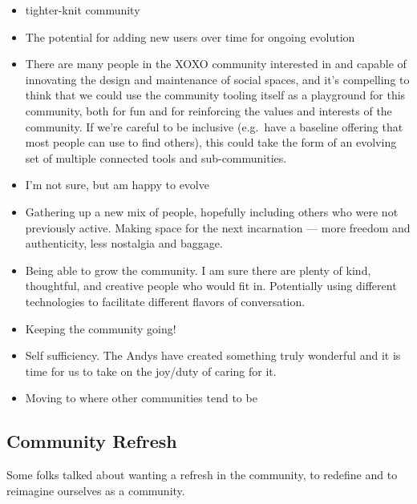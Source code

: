 \documentclass[
]{book}
\providecommand{\tightlist}{%
  \setlength{\itemsep}{0pt}\setlength{\parskip}{0pt}}
\begin{document}
\begin{itemize}
\tightlist
\item
  tighter-knit community
\item
  The potential for adding new users over time for ongoing evolution
\item
  There are many people in the XOXO community interested in and capable of innovating the design and maintenance of social spaces, and it's compelling to think that we could use the community tooling itself as a playground for this community, both for fun and for reinforcing the values and interests of the community. If we're careful to be inclusive (e.g.~have a baseline offering that most people can use to find others), this could take the form of an evolving set of multiple connected tools and sub-communities.
\item
  I'm not sure, but am happy to evolve
\item
  Gathering up a new mix of people, hopefully including others who were not previously active. Making space for the next incarnation --- more freedom and authenticity, less nostalgia and baggage.
\item
  Being able to grow the community. I am sure there are plenty of kind, thoughtful, and creative people who would fit in.
  Potentially using different technologies to facilitate different flavors of conversation.
\item
  Keeping the community going!
\item
  Self sufficiency. The Andys have created something truly wonderful and it is time for us to take on the joy/duty of caring for it.
\item
  Moving to where other communities tend to be
\end{itemize}

\subsection{Community Refresh}\label{community-refresh}

Some folks talked about wanting a refresh in the community, to redefine and to reimagine ourselves as a community.
\end{document}
